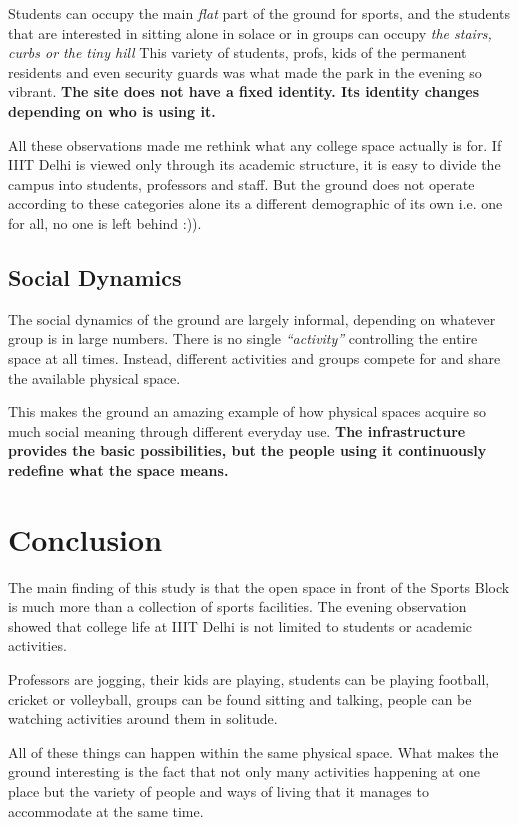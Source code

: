 \documentclass[twocolumn, 12pt]{article}
\begin{document}
Students can occupy the main \textit{flat} part of the ground for sports, and the students 
that are interested in sitting alone in solace or in groups can occupy \textit{the stairs, curbs or the tiny hill}
This variety of students, profs, kids of the permanent residents and even security guards was what made the park in the evening so vibrant. 
\textbf{The site does not have a fixed identity. Its identity changes depending on who is using it.}

All these observations made me rethink what any college space actually is for. 
If IIIT Delhi is viewed only through its academic structure, it is easy to 
divide the campus into students, professors and staff. 
But the ground does not operate according to these categories alone its a different
demographic of its own i.e. one for all, no one is left behind :)). 


\subsection{Social Dynamics}

The social dynamics of the ground are largely informal, depending on whatever group is in large numbers. 
There is no single \textit{``activity''} controlling the entire space at all times. 
Instead, different activities and groups compete for and share the available physical space.

This makes the ground an amazing example of how physical 
spaces acquire so much social meaning through different everyday use. 
\textbf{The infrastructure provides the basic possibilities, 
but the people using it continuously redefine what the space means.}


\section{Conclusion}

The main finding of this study is that the open space in front of the Sports Block is 
much more than a collection of sports facilities. The evening observation showed that 
college life at IIIT Delhi is not limited to students or academic activities. 

Professors are jogging, their kids are playing, students can be playing 
football, cricket or volleyball, groups can be found sitting and talking, people can be 
watching activities around them in solitude.

All of these things can happen within the same physical space. 
What makes the ground interesting is the fact that not only many activities happening at one place
but the variety of people and ways of living that it manages to accommodate 
at the same time. 
\end{document}
